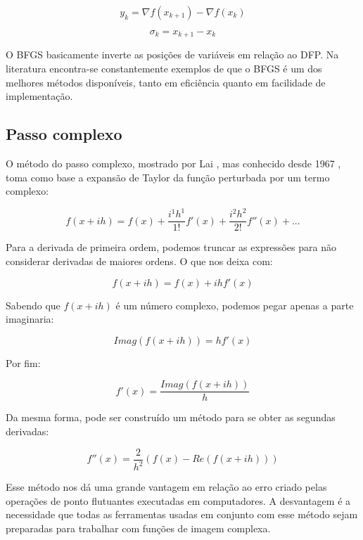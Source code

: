 \begin{equation}
y_k = \nabla f(x_{k+1}) - \nabla f(x_k)
\end{equation}

\begin{equation}
\sigma_k = x_{k+1} - x_k
\end{equation}

O BFGS basicamente inverte as posições de variáveis em relação ao DFP.
Na literatura encontra-se constantemente exemplos de que o BFGS é um dos melhores
métodos disponíveis, tanto em eficiência quanto em facilidade de implementação.

\subsection{Passo complexo}
O método do passo complexo, mostrado por Lai \cite{Lai_2005}, mas
conhecido desde 1967 \cite{Lyness_1967}, toma como base a expansão de Taylor da função
perturbada por um termo complexo:

\begin{equation}
f(x + ih) = f(x) + \frac{i^1h^1}{1!}f'(x) + \frac{i^2h^2}{2!} f''(x) + ...
\end{equation}

Para a derivada de primeira ordem, podemos truncar as expressões para não considerar derivadas
de maiores ordens. O que nos deixa com:


\begin{equation}
f(x + ih) = f(x) + ihf'(x)
\end{equation}

Sabendo que \(f(x+ih)\) é um número complexo, podemos pegar apenas a parte imaginaria:

\begin{equation}
Imag(f(x + ih)) = hf'(x)
\end{equation}

Por fim:

\begin{equation}
f'(x) = \frac{Imag(f(x + ih))}{h}
\end{equation}

Da mesma forma, pode ser construído um método para se obter as segundas derivadas:

\begin{equation}
f''(x) = \frac{2}{h^2} (f(x) - Re(f(x+ih)))
\end{equation}

Esse método nos dá uma grande vantagem em relação ao erro criado pelas operações de ponto flutuantes
executadas em computadores. A desvantagem é a necessidade que todas as ferramentas usadas em
conjunto com esse método sejam preparadas para trabalhar com funções de imagem complexa.

